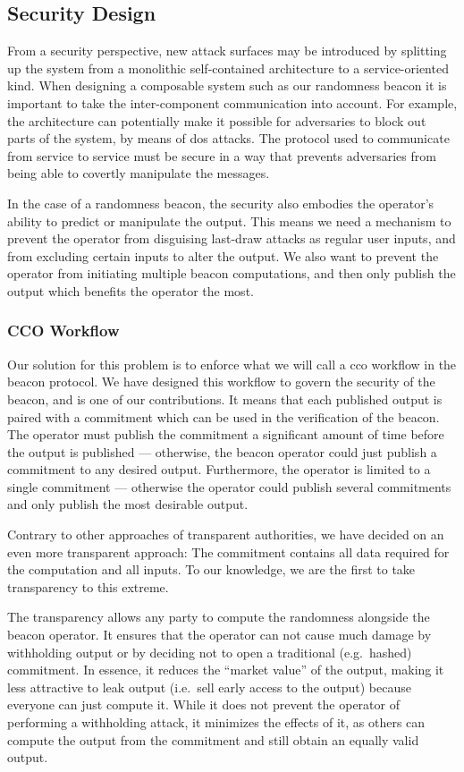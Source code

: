 \subsection{Security Design}%
\label{sub:security_design}
From a security perspective, new attack surfaces may be introduced by splitting up the system from a monolithic self-contained architecture to a service-oriented kind.
When designing a composable system such as our randomness beacon it is important to take the inter-component communication into account.
For example, the architecture can potentially make it possible for adversaries to block out parts of the system, by means of \gls{dos} attacks.
The protocol used to communicate from service to service must be secure in a way that prevents adversaries from being able to covertly manipulate the messages.

In the case of a randomness beacon, the security also embodies the operator's ability to predict or manipulate the output.
This means we need a mechanism to prevent the operator from disguising last-draw attacks as regular user inputs, and from excluding certain inputs to alter the output.
We also want to prevent the operator from initiating multiple beacon computations, and then only publish the output which benefits the operator the most.

\subsubsection{CCO Workflow}
Our solution for this problem is to enforce what we will call a \gls{cco} workflow in the beacon protocol.
We have designed this workflow to govern the security of the beacon, and is one of our contributions.
It means that each published output is paired with a commitment which can be used in the verification of the beacon.
The operator must publish the commitment a significant amount of time before the output is published --- otherwise, the beacon operator could just publish a commitment to any desired output.
Furthermore, the operator is limited to a single commitment --- otherwise the operator could publish several commitments and only publish the most desirable output.

Contrary to other approaches of transparent authorities, we have decided on an even more transparent approach: The commitment contains all data required for the computation and all inputs.
To our knowledge, we are the first to take transparency to this extreme.

The transparency allows any party to compute the randomness alongside the beacon operator.
It ensures that the operator can not cause much damage by withholding output or by deciding not to open a traditional (e.g.\ hashed) commitment.
In essence, it reduces the \enquote{market value} of the output, making it less attractive to leak output (i.e.\ sell early access to the output) because everyone can just compute it.
While it does not prevent the operator of performing a withholding attack, it minimizes the effects of it, as others can compute the output from the commitment and still obtain an equally valid output.

